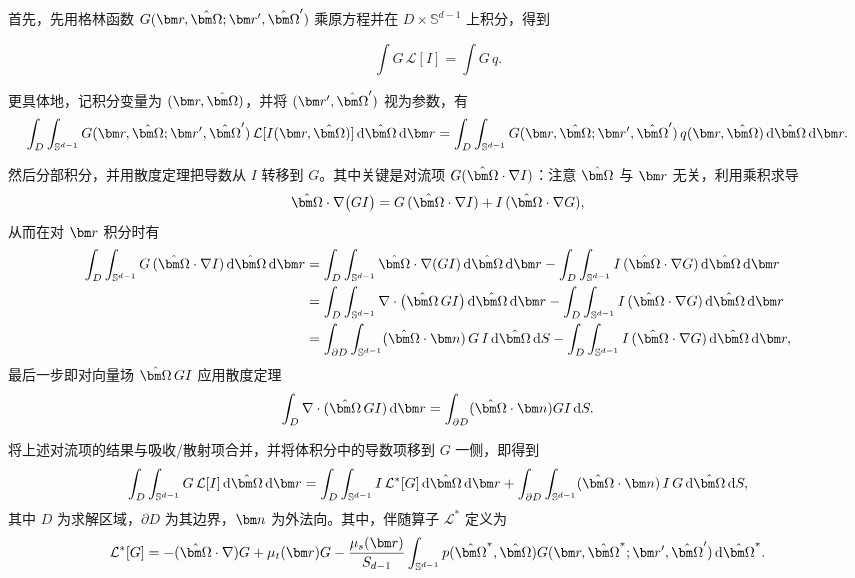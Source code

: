 首先，先用格林函数 $G(\br,\bOmega;\br',\bOmega')$ 乘原方程并在 $D\times\mathbb{S}^{d-1}$ 上积分，得到

\begin{equation}
    \int G\,\mathcal{L}[I]=\int G\,q.
\end{equation}

更具体地，记积分变量为 $(\br,\bOmega)$，并将 $(\br',\bOmega')$ 视为参数，有
\begin{equation}
    \int_{D}\int_{\mathbb{S}^{d-1}} G(\br,\bOmega;\br',\bOmega')\, \mathcal{L}[I(\br,\bOmega)]\diff\bOmega\diff\br
    = \int_{D}\int_{\mathbb{S}^{d-1}} G(\br,\bOmega;\br',\bOmega')\, q(\br,\bOmega)\diff\bOmega\diff\br.
\end{equation}

然后分部积分，并用散度定理把导数从 $I$ 转移到 $G$。其中关键是对流项 $G(\bOmega\cdot\nabla I)$：注意 $\bOmega$ 与 $\br$ 无关，利用乘积求导
\begin{equation}
    \bOmega\cdot\nabla\bigl(GI\bigr)=G\,(\bOmega\cdot\nabla I)+I\,(\bOmega\cdot\nabla G),
\end{equation}
从而在对 $\br$ 积分时有
\begin{equation}
    \begin{aligned}
        \int_{D}\int_{\mathbb{S}^{d-1}} G\,(\bOmega\cdot\nabla I)\diff\bOmega\diff\br
         & = \int_{D}\int_{\mathbb{S}^{d-1}} \bOmega\cdot\nabla(GI)\diff\bOmega\diff\br
        - \int_{D}\int_{\mathbb{S}^{d-1}} I\,(\bOmega\cdot\nabla G)\diff\bOmega\diff\br             \\
         & = \int_{D}\int_{\mathbb{S}^{d-1}} \nabla\cdot\bigl(\bOmega\,GI\bigr)\diff\bOmega\diff\br
        - \int_{D}\int_{\mathbb{S}^{d-1}} I\,(\bOmega\cdot\nabla G)\diff\bOmega\diff\br             \\
         & = \int_{\partial D}\int_{\mathbb{S}^{d-1}} (\bOmega\cdot\bn)\,G\,I\diff\bOmega\diff S
        - \int_{D}\int_{\mathbb{S}^{d-1}} I\,(\bOmega\cdot\nabla G)\diff\bOmega\diff\br,
    \end{aligned}
\end{equation}
最后一步即对向量场 $\bOmega\,GI$ 应用散度定理
\begin{equation}
    \int_{D}\nabla\cdot(\bOmega\,GI)\diff\br=\int_{\partial D}(\bOmega\cdot\bn)GI\diff S.
\end{equation}

将上述对流项的结果与吸收/散射项合并，并将体积分中的导数项移到 $G$ 一侧，即得到
\begin{equation}
    \int_{D}\int_{\mathbb{S}^{d-1}} G\, \mathcal{L}[I] \diff\bOmega\diff\br
    = \int_{D}\int_{\mathbb{S}^{d-1}} I\, \mathcal{L}^*[G] \diff\bOmega\diff\br
    + \int_{\partial D}\int_{\mathbb{S}^{d-1}} (\bOmega\cdot\bn)\, I\, G \diff\bOmega\diff S,
\end{equation}
其中 $D$ 为求解区域，$\partial D$ 为其边界，$\bn$ 为外法向。其中，伴随算子 $\mathcal{L}^*$ 定义为
\begin{equation}
    \mathcal{L}^*[G] = - (\bOmega\cdot\nabla) G + \mu_t(\br) G
    - \frac{\mu_s(\br)}{S_{d-1}} \int_{\mathbb{S}^{d-1}} p(\bOmega^*,\bOmega) G(\br,\bOmega^*;\br',\bOmega')\diff\bOmega^*.
\end{equation}

